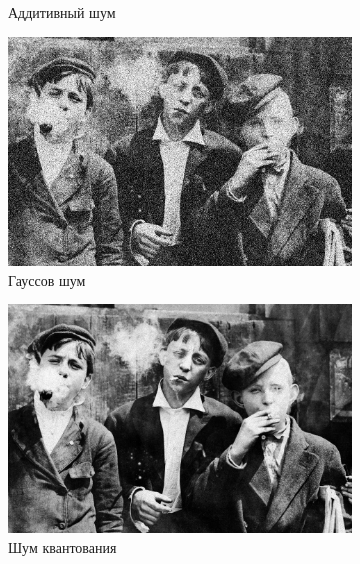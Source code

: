 \begin{figure}[ht!]
\begin{subfigure}[b]{0.5\linewidth}
    \caption{Аддитивный шум} 
    \vspace{4ex}
  \end{subfigure}%
  \begin{subfigure}[b]{0.5\linewidth}
    \centering
    \includegraphics[width=0.95\linewidth]{../Adaptive_Median_Filter/Adaptive_Median_Gaussian_noise_k=5.jpg} 
    \caption{Гауссов шум} 
    \vspace{4ex}
  \end{subfigure}
  \begin{subfigure}[b]{0.5\linewidth}
    \centering
    \includegraphics[width=0.95\linewidth]{../Adaptive_Median_Filter/Adaptive_Median_Poisson_noise_k=5.jpg} 
    \caption{Шум квантования} 
  \end{subfigure}%
  \begin{subfigure}[b]{0.5\linewidth}
      \centering

\end{subfigure}
\end{figure}
